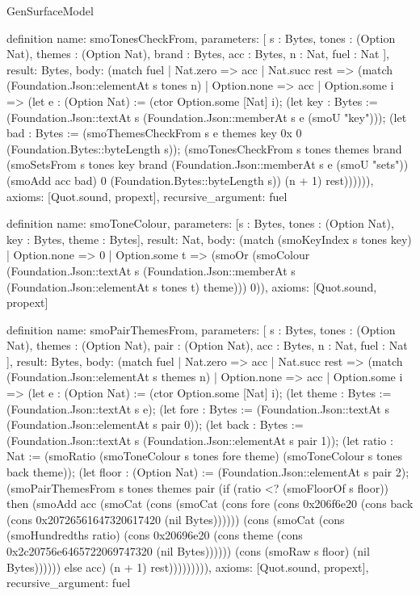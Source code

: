 \begin{lexlean}{GenSurfaceModel}
\begin{semanticmodule}
definition{
  name: smoTonesCheckFrom,
  parameters: [
    s : Bytes,
    tones : (Option Nat),
    themes : (Option Nat),
    brand : Bytes,
    acc : Bytes,
    n : Nat,
    fuel : Nat
  ],
  result: Bytes,
  body: (match fuel
    | Nat.zero => acc
    | Nat.succ rest => (match (Foundation.Json::elementAt s tones n)
      | Option.none => acc
      | Option.some i => (let e : (Option Nat) := (ctor Option.some [Nat] i); (let key : Bytes := (Foundation.Json::textAt s (Foundation.Json::memberAt s e (smoU "key"))); (let bad : Bytes := (smoThemesCheckFrom s e themes key 0x 0 (Foundation.Bytes::byteLength s)); (smoTonesCheckFrom s tones themes brand (smoSetsFrom s tones key brand (Foundation.Json::memberAt s e (smoU "sets")) (smoAdd acc bad) 0 (Foundation.Bytes::byteLength s)) (n + 1) rest)))))),
  axioms: [Quot.sound, propext],
  recursive_argument: fuel
}

definition{
  name: smoToneColour,
  parameters: [s : Bytes, tones : (Option Nat), key : Bytes, theme : Bytes],
  result: Nat,
  body: (match (smoKeyIndex s tones key)
    | Option.none => 0
    | Option.some t => (smoOr (smoColour (Foundation.Json::textAt s (Foundation.Json::memberAt s (Foundation.Json::elementAt s tones t) theme))) 0)),
  axioms: [Quot.sound, propext]
}

definition{
  name: smoPairThemesFrom,
  parameters: [
    s : Bytes,
    tones : (Option Nat),
    themes : (Option Nat),
    pair : (Option Nat),
    acc : Bytes,
    n : Nat,
    fuel : Nat
  ],
  result: Bytes,
  body: (match fuel
    | Nat.zero => acc
    | Nat.succ rest => (match (Foundation.Json::elementAt s themes n)
      | Option.none => acc
      | Option.some i => (let e : (Option Nat) := (ctor Option.some [Nat] i); (let theme : Bytes := (Foundation.Json::textAt s e); (let fore : Bytes := (Foundation.Json::textAt s (Foundation.Json::elementAt s pair 0)); (let back : Bytes := (Foundation.Json::textAt s (Foundation.Json::elementAt s pair 1)); (let ratio : Nat := (smoRatio (smoToneColour s tones fore theme) (smoToneColour s tones back theme)); (let floor : (Option Nat) := (Foundation.Json::elementAt s pair 2); (smoPairThemesFrom s tones themes pair (if (ratio <? (smoFloorOf s floor)) then (smoAdd acc (smoCat (cons (smoCat (cons fore (cons 0x206f6e20 (cons back (cons 0x20726561647320617420 (nil Bytes)))))) (cons (smoCat (cons (smoHundredths ratio) (cons 0x20696e20 (cons theme (cons 0x2c20756e6465722069747320 (nil Bytes)))))) (cons (smoRaw s floor) (nil Bytes)))))) else acc) (n + 1) rest))))))))),
  axioms: [Quot.sound, propext],
  recursive_argument: fuel
}


\end{semanticmodule}
\end{lexlean}
